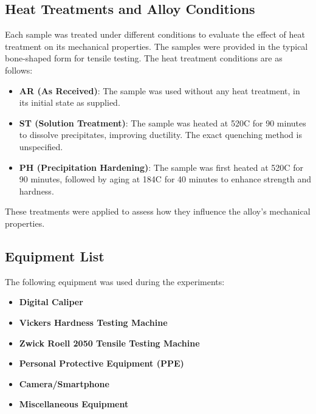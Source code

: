 \documentclass{article}
\begin{document}
\subsection{Heat Treatments and Alloy Conditions}
Each sample was treated under different conditions to evaluate the effect of heat treatment on its mechanical properties. The samples were provided in the typical bone-shaped form for tensile testing. The heat treatment conditions are as follows:
\begin{itemize}[itemsep=-1mm]
    \item \textbf{AR (As Received)}: The sample was used without any heat treatment, in its initial state as supplied.
    
    \item \textbf{ST (Solution Treatment)}: The sample was heated at 520\textdegree C for 90 minutes to dissolve precipitates, improving ductility. The exact quenching method is unspecified.
    
    \item \textbf{PH (Precipitation Hardening)}: The sample was first heated at 520\textdegree C for 90 minutes, followed by aging at 184\textdegree C for 40 minutes to enhance strength and hardness.
\end{itemize}
These treatments were applied to assess how they influence the alloy's mechanical properties.







\subsection{Equipment List}
The following equipment was used during the experiments:
\begin{itemize}
    \item \textbf{Digital Caliper}
    \item \textbf{Vickers Hardness Testing Machine}
    \item \textbf{Zwick Roell 2050 Tensile Testing Machine}
    \item \textbf{Personal Protective Equipment (PPE)}
    \item \textbf{Camera/Smartphone}
    \item \textbf{Miscellaneous Equipment}
\end{itemize}
\end{document}
